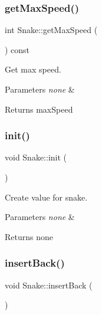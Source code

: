 \subsubsection{\texorpdfstring{get\+Max\+Speed()}{getMaxSpeed()}}
{\footnotesize\ttfamily int Snake\+::get\+Max\+Speed (\begin{DoxyParamCaption}{ }\end{DoxyParamCaption}) const}



Get max speed. 


\begin{DoxyParams}{Parameters}
{\em none} & \\
\hline
\end{DoxyParams}
\begin{DoxyReturn}{Returns}
max\+Speed 
\end{DoxyReturn}
\mbox{\label{class_snake_ac9f00db4b693de3c552a0ae7275c8412}} 
\subsubsection{\texorpdfstring{init()}{init()}}
{\footnotesize\ttfamily void Snake\+::init (\begin{DoxyParamCaption}{ }\end{DoxyParamCaption})}



Create value for snake. 


\begin{DoxyParams}{Parameters}
{\em none} & \\
\hline
\end{DoxyParams}
\begin{DoxyReturn}{Returns}
none 
\end{DoxyReturn}
\mbox{\label{class_snake_a2940bb3101863ab8a02a8a396c6552f2}} 
\subsubsection{\texorpdfstring{insert\+Back()}{insertBack()}}
{\footnotesize\ttfamily void Snake\+::insert\+Back (\begin{DoxyParamCaption}{ }\end{DoxyParamCaption})}



